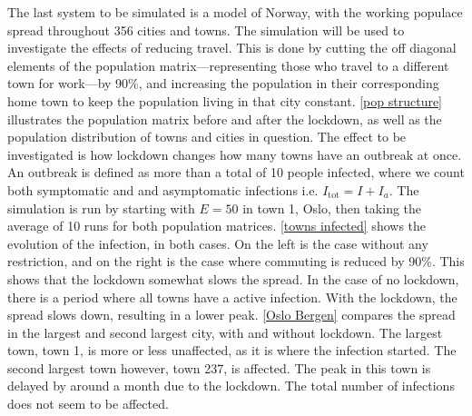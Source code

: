 \documentclass{article}
\begin{document}
    The last system to be simulated is a model of Norway, with the working populace spread throughout 356 cities and towns. 
    The simulation will be used to investigate the effects of reducing travel.
    This is done by cutting the off diagonal elements of the population matrix---representing those who travel to a different town for work---by 90\%, and increasing the population in their corresponding home town to keep the population living in that city constant.
    \autoref{pop structure} illustrates the population matrix before and after the lockdown, as well as the population distribution of towns and cities in question.
    The effect to be investigated is how lockdown changes how many towns have an outbreak at once.
    An outbreak is defined as more than a total of 10 people infected, where we count both symptomatic and and asymptomatic infections i.e. $I_\mathrm{tot}=I + I_a$.
    The simulation is run by starting with $E=50$ in town 1, Oslo, then taking the average of 10 runs for both population matrices.
    \autoref{towns infected} shows the evolution of the infection, in both cases. 
    On the left is the case without any restriction, and on the right is the case where commuting is reduced by 90\%. 
    This shows that the lockdown somewhat slows the spread.
    In the case of no lockdown, there is a period where all towns have a active infection.
    With the lockdown, the spread slows down, resulting in a lower peak.
    \autoref{Oslo Bergen} compares the spread in the largest and second largest city, with and without lockdown.
    The largest town, town 1, is more or less unaffected, as it is where the infection started.
    The second largest town however, town 237, is affected.
    The peak in this town is delayed by around a month due to the lockdown.
    The total number of infections does not seem to be affected.
\end{document}
